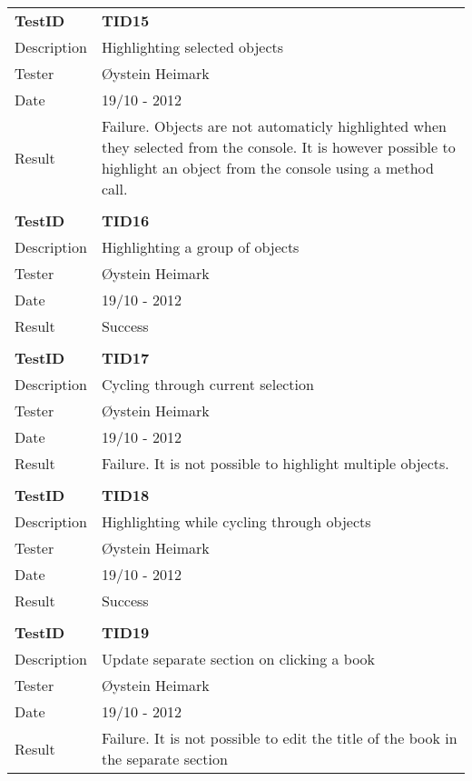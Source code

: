 \begin{table}
\begin{tabular}{ l p{13cm} }
\bf{TestID}		&\bf{TID15}			\\
Description	&Highlighting selected objects	\\
Tester		&Øystein Heimark	\\
Date			&19/10 - 2012	\\
Result		&Failure. Objects are not automaticly highlighted when they selected from the console. It is however possible to highlight an object from the console using a method call.	\\
\hline \\ [-2.0ex]

\bf{TestID}		&\bf{TID16}			\\
Description	&Highlighting a group of objects\\
Tester		&Øystein Heimark	\\
Date			&19/10 - 2012	\\
Result		&Success			\\
\hline \\ [-2.0ex]

\bf{TestID}		&\bf{TID17}			\\
Description	&Cycling through current selection	\\
Tester		&Øystein Heimark	\\
Date			&19/10 - 2012	\\
Result		&Failure. It is not possible to highlight multiple objects.		\\
\hline \\ [-2.0ex]

\bf{TestID}		&\bf{TID18}			\\
Description	&Highlighting while cycling through objects	\\
Tester		&Øystein Heimark	\\
Date			&19/10 - 2012	\\
Result		&Success	\\
\hline \\ [-2.0ex]

\bf{TestID}		&\bf{TID19}			\\
Description	&Update separate section on clicking a book	\\
Tester		&Øystein Heimark	\\
Date			&19/10 - 2012	\\
Result		&Failure. It is not possible to edit the title of the book in the separate section		\\
\hline

\end{tabular}
\label{table:sp2testresults}
\end{table}


